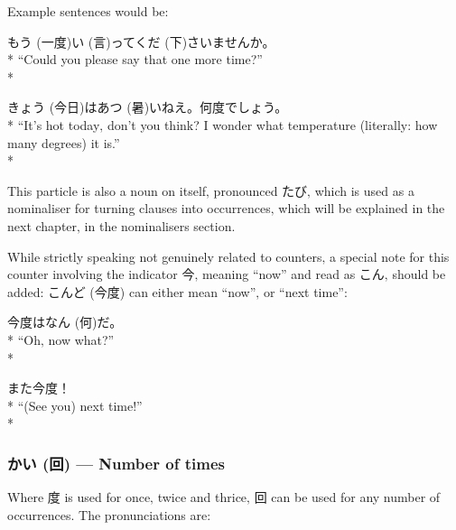 \documentclass[11pt, b5paper, twoside, openright, onecolumn]{book}
\makeatletter
\newcommand*{\rubystack}[2]{{\relscale{0.5}%
  \begin{tabular}[b]{@{}c@{}}%
    {#1}\\%
   {\textscale{2}{#2}}%
  \end{tabular}}%
}
\DeclareRobustCommand*{\ruby}[2]{%
  \mbox{%
    \setlength{\parskip}{0ex}%
    \BeginAccSupp{method=pdfstringdef,ActualText={#1}}%
      \rubystack{\phantom{#2}}{#1}%
      \llap{%
        \rubystack{#2}{\phantom{#1}}%
      }%
    \EndAccSupp{}%
  }%
}
\renewcommand*{\ruby}[2]{#2 (#1)}%
\newenvironment{exampleblock}{
\setlength{\parindent}{0.6in}
\begin{minipage}[t]{\dimexpr\textwidth-\parindent}}
{\end{minipage}}
\makeatother
\begin{document}
Example sentences would be:

\vspace{0.4cm}
\begin{exampleblock}
もう\ruby{一度}{}\ruby{言}{い}って\ruby{下}{くだ}さいませんか。 \\* 
“Could you please say that one more time?” \\* 
\end{exampleblock}
\vspace{0.2cm}

\begin{exampleblock}
\ruby{今日}{きょう}は\ruby{暑}{あつ}いねえ。何度でしょう。 \\* 
“It’s hot today‚ don’t you think? I wonder what temperature (literally: how many degrees) it is.” \\* 
\end{exampleblock}
\vspace{0.2cm}

This particle is also a noun on itself‚ pronounced たび‚ which is used as a nominaliser for turning clauses into occurrences‚ which will be explained in the next chapter‚ in the nominalisers section.

While strictly speaking not genuinely related to counters‚ a special note for this counter involving the indicator 今‚ meaning “now” and read as こん‚ should be added: \ruby{今度}{こんど} can either mean “now”‚ or “next time”:

\vspace{0.4cm}
\begin{exampleblock}
今度は\ruby{何}{なん}だ。 \\* 
“Oh‚ now what?” \\* 
\end{exampleblock}
\vspace{0.2cm}

\begin{exampleblock}
また今度！ \\* 
“(See you) next time!” \\* 
\end{exampleblock}
\subsubsection{\ruby{回}{かい} — Number of times}


Where 度 is used for once‚ twice and thrice‚ 回 can be used for any number of occurrences. The pronunciations are:
\end{document}
